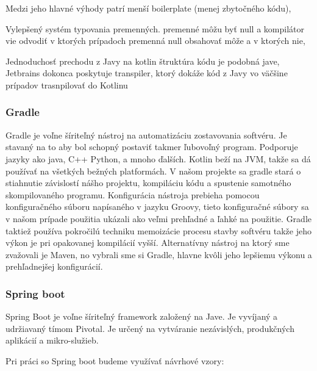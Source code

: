 Medzi jeho hlavné výhody patrí menší boilerplate (menej zbytočného kódu),  

Vylepšený systém typovania premenných. premenné môžu byť null a kompilátor vie odvodiť v ktorých prípadoch premenná null obsahovať môže a v ktorých nie,  

  

Jednoduchosť prechodu z Javy na kotlin štruktúra kódu je podobná jave, Jetbrains dokonca poskytuje transpiler, ktorý dokáže kód z Javy vo väčšine prípadov trasnpilovať do Kotlinu 


  

\subsubsection{Gradle} 

Gradle je voľne šíriteľný nástroj na automatizáciu zostavovania softvéru. Je stavaný na to aby bol schopný postaviť takmer ľubovoľný program. Podporuje jazyky ako java, C++ Python, a mnoho ďalších. Kotlin beží na JVM, takže sa dá používať na všetkých bežných platformách. V našom projekte sa gradle stará o stiahnutie závislostí nášho projektu, kompiláciu kódu a spustenie samotného skompilovaného programu. Konfigurácia nástroja prebieha pomocou konfiguračného súboru napísaného v jazyku Groovy, tieto konfiguračné  súbory sa v našom prípade použitia ukázali ako veľmi prehľadné a ľahké na použitie. Gradle taktiež používa pokročilú techniku memoizácie procesu stavby softvéru takže jeho výkon je pri opakovanej kompilácií vyšší. Alternatívny nástroj na ktorý sme zvažovali je Maven, no vybrali sme si Gradle, hlavne kvôli jeho lepšiemu výkonu a prehľadnejšej konfigurácií. 

  


  

  

\subsubsection{Spring boot} 

 Spring Boot je voľne šíriteľný framework založený na Jave. Je vyvíjaný a udržiavaný tímom Pivotal. Je určený na vytváranie nezávislých, produkčných aplikácií a mikro-služieb.  


Pri práci so Spring boot budeme využívať návrhové vzory: 

